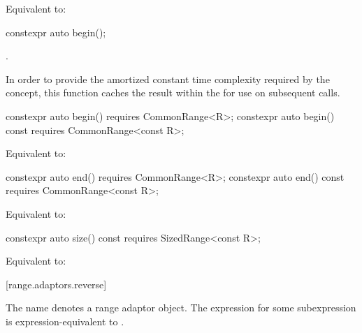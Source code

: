 \begin{addedblock}
\begin{itemdescr}
\pnum
\effects Equivalent to: 
\end{itemdescr}

%
\begin{itemdecl}
constexpr auto begin();
\end{itemdecl}

\begin{itemdescr}
\pnum
\returns
{}.

\pnum
\remarks In order to provide the amortized constant time complexity required by
the  concept, this function caches the result within the
 for use on subsequent calls.
\end{itemdescr}

%
\begin{itemdecl}
constexpr auto begin() requires CommonRange<R>;
constexpr auto begin() const requires CommonRange<const R>;
\end{itemdecl}

\begin{itemdescr}
\pnum
\effects Equivalent to: 
\end{itemdescr}

%
\begin{itemdecl}
constexpr auto end() requires CommonRange<R>;
constexpr auto end() const requires CommonRange<const R>;
\end{itemdecl}

\begin{itemdescr}
\pnum
\effects Equivalent to: 
\end{itemdescr}

%
\begin{itemdecl}
constexpr auto size() const requires SizedRange<const R>;
\end{itemdecl}

\begin{itemdescr}
\pnum
\effects Equivalent to: 
\end{itemdescr}

[range.adaptors.reverse]{}

\pnum
The name  denotes a
range adaptor object. The expression
 for some subexpression  is
expression-equivalent to .
\end{addedblock}
